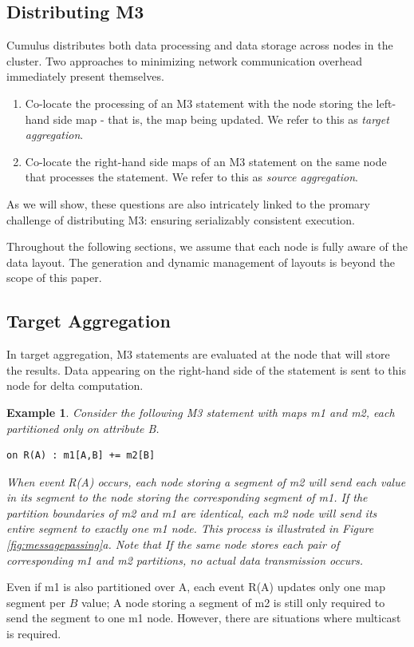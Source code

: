 \documentclass{vldb}
\newtheorem{example}[theorem]{Example}
\begin{document}
\subsection{Distributing M3}
Cumulus distributes both data processing and data storage across nodes in the cluster.  Two approaches to minimizing network communication overhead immediately present themselves.  
\begin{enumerate}
\item Co-locate the processing of an M3 statement with the node storing the left-hand side map - that is, the map being updated. We refer to this as \textit{target aggregation}.
\item Co-locate the right-hand side maps of an M3 statement on the same node that processes the statement.  We refer to this as \textit{source aggregation}.
\end{enumerate}
As we will show, these questions are also intricately linked to the promary challenge of distributing M3: ensuring serializably consistent execution. 

Throughout the following sections, we assume that each node is fully aware of the data layout.  The generation and dynamic management of layouts is beyond the scope of this paper.

\subsection{Target Aggregation}
In target aggregation, M3 statements are evaluated at the node that will store the results.  Data appearing on the right-hand side of the statement is sent to this node for delta computation.  

\begin{example}
Consider the following M3 statement with maps m1 and m2, each partitioned only on attribute B.
\begin{verbatim}
on R(A) : m1[A,B] += m2[B]
\end{verbatim}
When event R(A) occurs, each node storing a segment of m2 will send each value in its segment to the node storing the corresponding segment of m1.  If the partition boundaries of m2 and m1 are identical, each m2 node will send its entire segment to exactly one m1 node.  This process is illustrated in Figure \ref{fig:messagepassing}a.  Note that If the same node stores each pair of corresponding m1 and m2 partitions, no actual data transmission occurs.  
\end{example}

Even if m1 is also partitioned over A, each event R(A) updates only one map segment per $B$ value; A node storing a segment of m2 is still only required to send the segment to one m1 node.  However, there are situations where multicast is required.  
\end{document}
